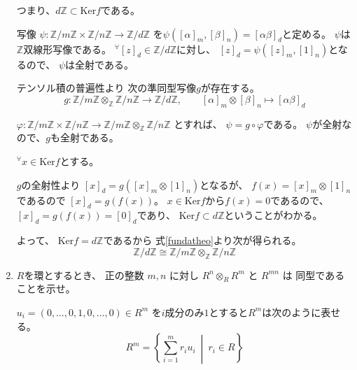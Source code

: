 \documentclass[12pt,b5paper]{ltjsarticle}
\begin{document}
\begin{enumerate}
      つまり、$d\mathbb{Z} \subset \mathrm{Ker}f$である。


      写像
      $\psi : \mathbb{Z}/m\mathbb{Z} \times \mathbb{Z}/n\mathbb{Z}
      \to \mathbb{Z}/d\mathbb{Z}$
      を$\psi([\alpha]_{m},[\beta]_{n}) = [\alpha\beta]_{d}$と定める。
      $\psi$は$\mathbb{Z}$双線形写像である。
      ${}^{\forall}[z]_{d}\in\mathbb{Z}/d\mathbb{Z}$に対し、
      $[z]_{d} = \psi([z]_{m}, [1]_{n})$となるので、
      $\psi$は全射である。

      テンソル積の普遍性より
      次の準同型写像$g$が存在する。
      \begin{equation}
       g : \mathbb{Z}/m\mathbb{Z} \otimes_{\mathbb{Z}} \mathbb{Z}/n\mathbb{Z}
        \to \mathbb{Z}/d\mathbb{Z},
        \qquad [\alpha]_{m} \otimes [\beta]_{n} \mapsto [\alpha\beta]_{d}
      \end{equation}

      $\varphi : \mathbb{Z}/m\mathbb{Z} \times \mathbb{Z}/n\mathbb{Z} \to \mathbb{Z}/m\mathbb{Z} \otimes_{\mathbb{Z}} \mathbb{Z}/n\mathbb{Z}$
      とすれば、
      $\psi = g\circ \varphi$である。
      $\psi$が全射なので、$g$も全射である。

      ${}^{\forall}x\in\mathrm{Ker}f$とする。

      $g$の全射性より
      $[x]_{d} = g([x]_{m}\otimes [1]_{n})$となるが、
      $f(x)=[x]_{m}\otimes [1]_{n}$であるので
      $[x]_{d}=g(f(x))$。
      $x\in\mathrm{Ker}f$から$f(x)=0$であるので、
      $[x]_{d}=g(f(x))=[0]_{d}$であり、
      $\mathrm{Ker}f \subset d\mathbb{Z}$ということがわかる。

      よって、
      $\mathrm{Ker}f = d\mathbb{Z}$であるから
      式\eqref{fundatheo}より次が得られる。
      \begin{equation}
       \mathbb{Z}/d\mathbb{Z} \cong \mathbb{Z}/m\mathbb{Z}\otimes_{\mathbb{Z}}\mathbb{Z}/n\mathbb{Z}
      \end{equation}


      \hrulefill

 \item
      $R$を環とするとき、
      正の整数 $m, n$ に対し $R^{n} \otimes_{R} R^{m}$ と $R^{mn}$ は
      同型であることを示せ。

      \dotfill

      $u_{i}=(0,\dots,0,1,0,\dots,0) \in R^{m}$
      を$i$成分のみ$1$とすると$R^{m}$は次のように表せる。
      \begin{equation}
       R^{m} = \left \{ \sum_{i=1}^{m} r_{i}u_{i} \:\middle|\: r_{i} \in R \right \}
      \end{equation}


\end{enumerate}
\end{document}
